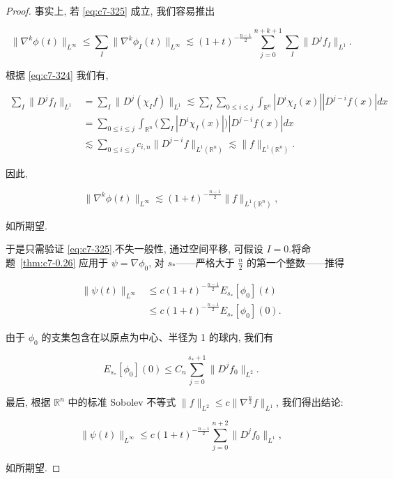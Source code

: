 \begin{proof}
事实上, 若 \eqref{eq:c7-325} 成立, 我们容易推出

\[
\|\nabla^k\phi(t)\|_{L^{\infty}} \leq \sum_I\|\nabla^k\phi_I(t)\|_{L^{\infty}} \lesssim (1+t)^{-\frac{n-1}{2}}\sum_{j=0}^{n+k+1}\sum_I\|D^j f_I\|_{L^1}.
\]

根据 \eqref{eq:c7-324} 我们有,

\[
\begin{aligned}
\sum_I\|D^j f_I\|_{L^1} &= \sum_I\|D^j(\chi_I f)\|_{L^1} \lesssim \sum_I\sum_{0\leq i\leq j}\int_{\mathbb{R}^n}|D^i\chi_I(x)||D^{j-i}f(x)|dx \\
&= \sum_{0\leq i\leq j}\int_{\mathbb{R}^n}\Big(\sum_I|D^i\chi_I(x)|\Big)|D^{j-i}f(x)|dx \\
&\lesssim \sum_{0\leq i\leq j}c_{i, n}\|D^{j-i}f\|_{L^1(\mathbb{R}^n)} \lesssim \|f\|_{L^1(\mathbb{R}^n)}.
\end{aligned}
\]

因此,

\[
\|\nabla^k\phi(t)\|_{L^{\infty}} \lesssim (1+t)^{-\frac{n-1}{2}}\|f\|_{L^1(\mathbb{R}^n)},
\]

如所期望.

于是只需验证 \eqref{eq:c7-325}.不失一般性, 通过空间平移, 可假设 $I = 0$.将命题~\ref{thm:c7-0.26} 应用于 $\psi = \nabla\phi_0$, 对 $s_*$——严格大于 $\frac{n}{2}$ 的第一个整数——推得

\[
\begin{aligned}
\|\psi(t)\|_{L^{\infty}} &\leq c(1+t)^{-\frac{n-1}{2}}E_{s_*}[\phi_0](t) \\
&\leq c(1+t)^{-\frac{n-1}{2}}E_{s_*}[\phi_0](0).
\end{aligned}
\]

由于 $\phi_0$ 的支集包含在以原点为中心、半径为 1 的球内, 我们有

\[
E_{s_*}[\phi_0](0) \leq C_n\sum_{j=0}^{s_*+1}\|D^j f_0\|_{L^2}.
\]

最后, 根据 $\mathbb{R}^n$ 中的标准 Sobolev 不等式 $\|f\|_{L^2} \leq c\|\nabla^{\frac{n}{2}}f\|_{L^1}$, 我们得出结论:

\[
\|\psi(t)\|_{L^{\infty}} \leq c(1+t)^{-\frac{n-1}{2}}\sum_{j=0}^{n+2}\|D^j f_0\|_{L^1},
\]

如所期望.
\end{proof}

